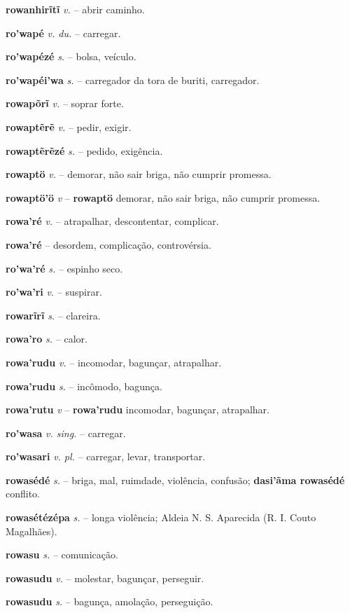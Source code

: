 \textbf{rowanhirĩtĩ} \textit{v.} -- abrir caminho.

\textbf{ro'wapé} \textit{v. du.} -- carregar.

\textbf{ro'wapézé} \textit{s.} -- bolsa, veículo.

\textbf{ro'wapéi'wa} \textit{s.} -- carregador da tora de buriti, carregador.

\textbf{rowapõrĩ} \textit{v.} -- soprar forte.

\textbf{rowaptẽrẽ} \textit{v.} -- pedir, exigir.

\textbf{rowaptẽrẽzé} \textit{s.} -- pedido, exigência.

\textbf{rowaptö} \textit{v.} -- demorar, não sair briga, não cumprir promessa.

\textbf{rowaptö'ö} \textit{v} -- \textbf{rowaptö} demorar, não sair briga, não cumprir promessa.

\textbf{rowa'ré} \textit{v.} -- atrapalhar, descontentar, complicar.

\textbf{rowa'ré} \textit{} -- desordem, complicação, controvérsia.

\textbf{ro'wa'ré} \textit{s.} -- espinho seco.

\textbf{ro'wa'ri} \textit{v.} -- suspirar.

\textbf{rowarĩrĩ} \textit{s.} -- clareira.

\textbf{rowa'ro} \textit{s.} -- calor.

\textbf{rowa'rudu} \textit{v.} -- incomodar, bagunçar, atrapalhar.

\textbf{rowa'rudu} \textit{s.} -- incômodo, bagunça.

\textbf{rowa'rutu} \textit{v} -- \textbf{rowa'rudu} incomodar, bagunçar, atrapalhar.

\textbf{ro'wasa} \textit{v. sing.} -- carregar.

\textbf{ro'wasari} \textit{v. pl.} -- carregar, levar, transportar.

\textbf{rowasédé} \textit{s.} -- briga, mal, ruimdade, violência, confusão; \textbf{dasi'ãma rowasédé} conflito.

\textbf{rowasétézépa} \textit{s.} -- longa violência; Aldeia N. S. Aparecida (R. I. Couto Magalhães).

\textbf{rowasu} \textit{s.} -- comunicação.

\textbf{rowasudu} \textit{v.} -- molestar, bagunçar, perseguir.

\textbf{rowasudu} \textit{s.} -- bagunça, amolação, perseguição.

